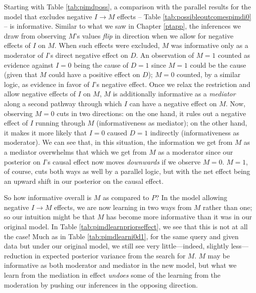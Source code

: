 \documentclass[
  12pt,
]{book}
\begin{document}
Starting with Table \ref{tab:pimdposs}, a comparison with the parallel results for the model that excludes negative \(I \rightarrow M\) effects -- Table \ref{tab:possibleoutcomespimdi0} -- is informative. Similar to what we saw in Chapter \ref{ptapp}, the inferences we draw from observing \(M\)'s values \emph{flip} in direction when we allow for negative effects of \(I\) on \(M\). When such effects were excluded, \(M\) was informative only as a moderator of \(I\)'s direct negative effect on \(D\). An observation of \(M=1\) counted as evidence against \(I=0\) being the cause of \(D=1\) since \(M=1\) could be the cause (given that \(M\) could have a positive effect on \(D\)); \(M=0\) counted, by a similar logic, as evidence in favor of \(I\)'s negative effect. Once we relax the restriction and allow negative effects of \(I\) on \(M\), \(M\) is additionally informative as a \emph{mediator} along a second pathway through which \(I\) can have a negative effect on \(M\). Now, observing \(M=0\) cuts in two directions: on the one hand, it rules out a negative effect of \(I\) running through \(M\) (informativeness as mediator); on the other hand, it makes it more likely that \(I=0\) caused \(D=1\) indirectly (informativeness as moderator). We can see that, in this situation, the information we get from \(M\) as a mediator overwhelms that which we get from \(M\) as a moderator since our posterior on \(I\)'s causal effect now moves \emph{downwards} if we observe \(M=0\). \(M=1\), of course, cuts both ways as well by a parallel logic, but with the net effect being an upward shift in our posterior on the causal effect.

So how informative overall is \(M\) as compared to \(P\)? In the model allowing negative \(I \rightarrow M\) effects, we are now learning in two ways from \(M\) rather than one; so our intuition might be that \(M\) has become more informative than it was in our original model. In Table \ref{tab:pimdlearnpriorseffect}, we see that this is not at all the case! Much as in Table \ref{tab:pimdlearni0d1}, for the same query and given data but under our original model, we still see very little---indeed, slightly less---reduction in expected posterior variance from the search for \(M\). \(M\) may be informative as both moderator and mediator in the new model, but what we learn from the mediation in effect \emph{undoes} some of the learning from the moderation by pushing our inferences in the opposing direction.
\end{document}

